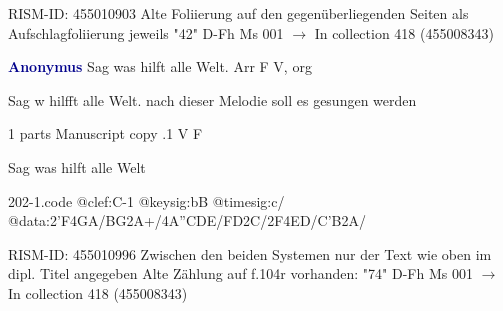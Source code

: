 \documentclass[twocolumn]{book}
\begin{document}
\newline RISM-ID: 455010903
\newline Alte Foliierung auf den gegenüberliegenden Seiten als Aufschlagfoliierung jeweils "42"
\newline D-Fh  Ms 001
\newline $\rightarrow$ In collection 418 (455008343)

\newline \par \vspace{7pt} \textcolor{darkblue}{\textbf{Anonymus  }}
\newline Sag was hilft alle Welt. Arr  F  
\newline V, org
\newline \begin{itshape} Sag w hilfft alle Welt. nach dieser Melodie soll es gesungen werden\end{itshape} 
\newline \textcolor{darkblue}{}  1 parts  
\newline Manuscript copy
.1  V  F
\newline \begin{footnotesize} Sag was hilft alle Welt \end{footnotesize}  
\begin{filecontents*}{202-1.code}
@clef:C-1
@keysig:bB
@timesig:c/
@data:2'F4GA/BG2A+/4A''CDE/FD2C/2F4ED/C'B2A/
\end{filecontents*}
\newline
%

\newline RISM-ID: 455010996
\newline Zwischen den beiden Systemen nur der Text wie oben im dipl. Titel angegeben
\newline Alte Zählung auf f.104r vorhanden: "74"
\newline D-Fh  Ms 001
\newline $\rightarrow$ In collection 418 (455008343)
\end{document}
